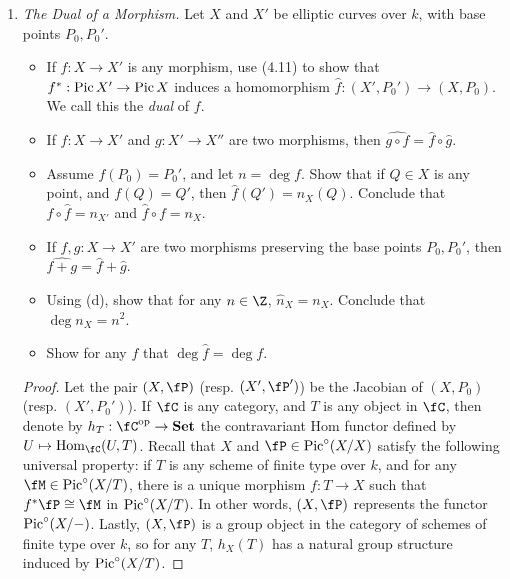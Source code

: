 \documentclass[a4paper]{article}
\begin{document}
\begin{enumerate} [label=\textbf{\arabic*.}, leftmargin=0em]

    \item[\textbf{7.}] \textit{The Dual of a Morphism.} Let $X$ and $X'$ be elliptic curves over $k$, with base points $P_0, P_0'$.
          \begin{itemize}
              \item[(a)] If $f : X \to X'$ is any morphism, use (4.11) to show that $f^* : \operatorname{Pic}{X'} \to \operatorname{Pic}{X}$ induces a homomorphism $\hat{f} : (X', P_0') \to (X, P_0)$.
                    We call this the \textit{dual} of $f$.
              \item[(b)] If $f : X \to X'$ and $g : X' \to X''$ are two morphisms, then $\widehat{g \circ f} = \hat{f} \circ \hat{g}$.
              \item[(c)] Assume $f(P_0) = P_0'$, and let $n = \deg{f}$.
                    Show that if $Q \in X$ is any point, and $f(Q) = Q'$, then $\hat{f}(Q') = n_X(Q)$.
                    Conclude that $f \circ \hat{f} = n_{X'}$ and $\hat{f} \circ f = n_X$.
              \item[(d)] If $f, g : X \to X'$ are two morphisms preserving the base points $P_0, P_0'$, then $\widehat{f + g} = \hat{f} + \hat{g}$.
              \item[(e)] Using (d), show that for any $n \in \Z$, $\hat{n}_X = n_{X}$.
                    Conclude that $\deg n_X = n^2$.
              \item[(f)] Show for any $f$ that $\deg{\hat{f}} = \deg{f}$.
          \end{itemize}

          \begin{proof} Let the pair $(X, \fP)$ (resp. $(X', \fP')$) be the Jacobian of $(X, P_0)$ (resp. $(X', P_0')$).
              If $\fC$ is any category, and $T$ is any object in $\fC$, then denote by $h_T : \fC^\text{op} \to \cSet$ the contravariant Hom functor defined by $U \mapsto \Hom_\fC(U, T)$.
              Recall that $X$ and $\fP \in \pic^\circ(X/X)$ satisfy the following universal property: if $T$ is any scheme of finite type over $k$, and for any $\fM \in \pic^\circ(X/T)$, there is a unique morphism $f : T \to X$ such that $f^*\fP \cong \fM$ in $\operatorname{Pic}^\circ(X/T)$.
              In other words, $(X, \fP)$ represents the functor $\operatorname{Pic}^\circ(X/-)$.
              Lastly, $(X, \fP)$ is a group object in the category of schemes of finite type over $k$, so for any $T$, $h_X(T)$ has a natural group structure induced by $\operatorname{Pic}^\circ(X/T)$.


\end{proof}
\end{enumerate}
\end{document}
